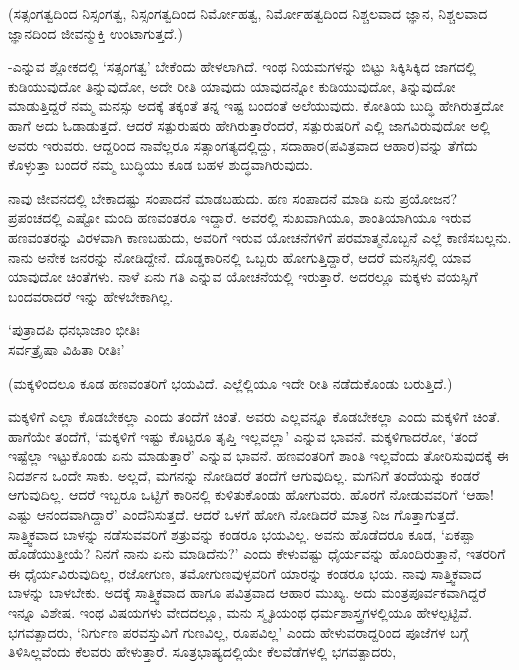 (ಸತ್ಸಂಗತ್ವದಿಂದ ನಿಸ್ಸಂಗತ್ವ, ನಿಸ್ಸಂಗತ್ವದಿಂದ ನಿರ್ಮೋಹತ್ವ, ನಿರ್ಮೋಹತ್ವದಿಂದ ನಿಶ್ಚಲವಾದ ಜ್ಞಾನ, ನಿಶ್ಚಲವಾದ ಜ್ಞಾನದಿಂದ ಜೀವನ್ಮುಕ್ತಿ ಉಂಟಾಗುತ್ತದೆ.)

-ಎನ್ನುವ ಶ್ಲೋಕದಲ್ಲಿ `ಸತ್ಸಂಗತ್ವ' ಬೇಕೆಂದು ಹೇಳಲಾಗಿದೆ. ಇಂಥ ನಿಯಮಗಳನ್ನು ಬಿಟ್ಟು  ಸಿಕ್ಕಿಸಿಕ್ಕಿದ ಜಾಗದಲ್ಲಿ ಕುಡಿಯುವುದೋ ತಿನ್ನುವುದೋ, ಅದೇ ರೀತಿ ಯಾವುದು ಯಾವುದನ್ನೋ ಕುಡಿಯುವುದೋ, ತಿನ್ನುವುದೋ ಮಾಡುತ್ತಿದ್ದರೆ ನಮ್ಮ ಮನಸ್ಸು ಅದಕ್ಕೆ ತಕ್ಕಂತೆ ತನ್ನ ಇಷ್ಟ ಬಂದಂತೆ ಅಲೆಯುವುದು. ಕೋತಿಯ ಬುದ್ಧಿ ಹೇಗಿರುತ್ತದೋ ಹಾಗೆ ಅದು ಓಡಾಡುತ್ತದೆ. ಆದರೆ ಸತ್ಪುರುಷರು ಹೇಗಿರುತ್ತಾರೆಂದರೆ, ಸತ್ಪುರುಷರಿಗೆ ಎಲ್ಲಿ ಜಾಗವಿರುವುದೋ ಅಲ್ಲಿ ಅವರು ಇರುವರು. ಆದ್ದರಿಂದ ನಾವೆಲ್ಲರೂ ಸತ್ಸಾಂಗತ್ಯದಲ್ಲಿದ್ದು, ಸದಾಹಾರ(ಪವಿತ್ರವಾದ ಆಹಾರ)ವನ್ನು ತೆಗೆದು ಕೊಳ್ಳುತ್ತಾ ಬಂದರೆ ನಮ್ಮ ಬುದ್ಧಿಯು ಕೂಡ ಬಹಳ ಶುದ್ಧವಾಗಿರುವುದು.

ನಾವು ಜೀವನದಲ್ಲಿ ಬೇಕಾದಷ್ಟು ಸಂಪಾದನೆ ಮಾಡಬಹುದು. ಹಣ ಸಂಪಾದನೆ ಮಾಡಿ ಏನು ಪ್ರಯೋಜನ? ಪ್ರಪಂಚದಲ್ಲಿ ಎಷ್ಟೋ ಮಂದಿ ಹಣವಂತರೂ ಇದ್ದಾರೆ. ಅವರಲ್ಲಿ ಸುಖವಾಗಿಯೂ, ಶಾಂತಿಯಾಗಿಯೂ ಇರುವ ಹಣವಂತರನ್ನು ವಿರಳವಾಗಿ ಕಾಣಬಹುದು, ಅವರಿಗೆ ಇರುವ ಯೋಚನೆಗಳಿಗೆ ಪರಮಾತ್ಮನೊಬ್ಬನೆ ಎಲ್ಲೆ ಕಾಣಿಸಬಲ್ಲನು. ನಾನು ಅನೇಕ ಜನರನ್ನು ನೋಡಿದ್ದೇನೆ. ದೊಡ್ಡಕಾರಿನಲ್ಲಿ ಒಬ್ಬರು ಹೋಗುತ್ತಿದ್ದಾರೆ, ಆದರೆ ಮನಸ್ಸಿನಲ್ಲಿ ಯಾವ ಯಾವುದೋ ಚಿಂತೆಗಳು. ನಾಳೆ ಏನು ಗತಿ ಎನ್ನುವ ಯೋಚನೆಯಲ್ಲಿ ಇರುತ್ತಾರೆ. ಅದರಲ್ಲೂ ಮಕ್ಕಳು ವಯಸ್ಸಿಗೆ ಬಂದವರಾದರೆ ಇನ್ನು ಹೇಳಬೇಕಾಗಿಲ್ಲ.

\begin{shloka}
`ಪುತ್ರಾದಪಿ ಧನಭಾಜಾಂ ಭೀತಿಃ\\
ಸರ್ವತ್ರೈಷಾ ವಿಹಿತಾ ರೀತಿಃ'
\end{shloka}

(ಮಕ್ಕಳಿಂದಲೂ ಕೂಡ ಹಣವಂತರಿಗೆ ಭಯವಿದೆ. ಎಲ್ಲೆಲ್ಲಿಯೂ ಇದೇ ರೀತಿ ನಡೆದುಕೊಂಡು ಬರುತ್ತಿದೆ.)

ಮಕ್ಕಳಿಗೆ ಎಲ್ಲಾ ಕೊಡಬೇಕಲ್ಲಾ ಎಂದು ತಂದೆಗೆ ಚಿಂತೆ. ಅವರು ಎಲ್ಲವನ್ನೂ ಕೊಡಬೇಕಲ್ಲಾ ಎಂದು ಮಕ್ಕಳಿಗೆ ಚಿಂತೆ. ಹಾಗೆಯೇ ತಂದೆಗೆ, `ಮಕ್ಕಳಿಗೆ ಇಷ್ಟು ಕೊಟ್ಟರೂ ತೃಪ್ತಿ ಇಲ್ಲವಲ್ಲಾ' ಎನ್ನುವ ಭಾವನೆ. ಮಕ್ಕಳಿಗಾದರೋ, `ತಂದೆ ಇಷ್ಟೆಲ್ಲಾ ಇಟ್ಟುಕೊಂಡು ಏನು ಮಾಡುತ್ತಾರೆ' ಎನ್ನುವ ಭಾವನೆ. ಹಣವಂತರಿಗೆ ಶಾಂತಿ ಇಲ್ಲವೆಂದು ತೋರಿಸುವುದಕ್ಕೆ ಈ ನಿದರ್ಶನ ಒಂದೇ ಸಾಕು. ಅಲ್ಲದೆ, ಮಗನನ್ನು ನೋಡಿದರೆ ತಂದೆಗೆ ಆಗುವುದಿಲ್ಲ. ಮಗನಿಗೆ ತಂದೆಯನ್ನು ಕಂಡರೆ ಆಗುವುದಿಲ್ಲ. ಆದರೆ ಇಬ್ಬರೂ ಒಟ್ಟಿಗೆ ಕಾರಿನಲ್ಲಿ ಕುಳಿತುಕೊಂಡು ಹೋಗುವರು. ಹೊರಗೆ ನೋಡುವವರಿಗೆ `ಆಹಾ! ಎಷ್ಟು ಆನಂದವಾಗಿದ್ದಾರೆ' ಎಂದೆನಿಸುತ್ತದೆ. ಆದರೆ ಒಳಗೆ ಹೋಗಿ ನೋಡಿದರೆ ಮಾತ್ರ ನಿಜ ಗೊತ್ತಾಗುತ್ತದೆ. ಸಾತ್ತ್ವಿಕವಾದ ಬಾಳನ್ನು ನಡೆಸುವವರಿಗೆ ಶತ್ರುವನ್ನು ಕಂಡರೂ ಭಯವಿಲ್ಲ. ಅವನು ಹೊಡೆದರೂ ಕೂಡ, `ಏಕಪ್ಪಾ ಹೊಡೆಯುತ್ತೀಯೆ? ನಿನಗೆ ನಾನು ಏನು ಮಾಡಿದೆನು?' ಎಂದು ಕೇಳುವಷ್ಟು ಧೈರ್ಯವನ್ನು ಹೊಂದಿರುತ್ತಾನೆ, ಇತರರಿಗೆ ಈ ಧೈರ್ಯವಿರುವುದಿಲ್ಲ, ರಜೋಗುಣ, ತಮೋಗುಣವುಳ್ಳವರಿಗೆ ಯಾರನ್ನು ಕಂಡರೂ ಭಯ. ನಾವು ಸಾತ್ತ್ವಿಕವಾದ ಬಾಳನ್ನು ಬಾಳಬೇಕು. ಅದಕ್ಕೆ ಸಾತ್ತ್ವಿಕವಾದ ಹಾಗೂ ಪವಿತ್ರವಾದ ಆಹಾರ ಮುಖ್ಯ. ಅದು ಮಂತ್ರಪೂರ್ವಕವಾಗಿದ್ದರೆ ಇನ್ನೂ ವಿಶೇಷ. ಇಂಥ ವಿಷಯಗಳು ವೇದದಲ್ಲೂ, ಮನು ಸ್ಮೃತಿಯಂಥ ಧರ್ಮಶಾಸ್ತ್ರಗಳಲ್ಲಿಯೂ ಹೇಳಲ್ಪಟ್ಟಿವೆ. ಭಗವತ್ಪಾದರು, `ನಿರ್ಗುಣ ಪರವಸ್ತುವಿಗೆ ಗುಣವಿಲ್ಲ, ರೂಪವಿಲ್ಲ' ಎಂದು ಹೇಳುವರಾದ್ದರಿಂದ ಪೂಜೆಗಳ ಬಗ್ಗೆ ತಿಳಿಸಿಲ್ಲವೆಂದು ಕೆಲವರು ಹೇಳುತ್ತಾರೆ. ಸೂತ್ರಭಾಷ್ಯದಲ್ಲಿಯೇ ಕೆಲವೆಡೆಗಳಲ್ಲಿ ಭಗವತ್ಪಾದರು,

